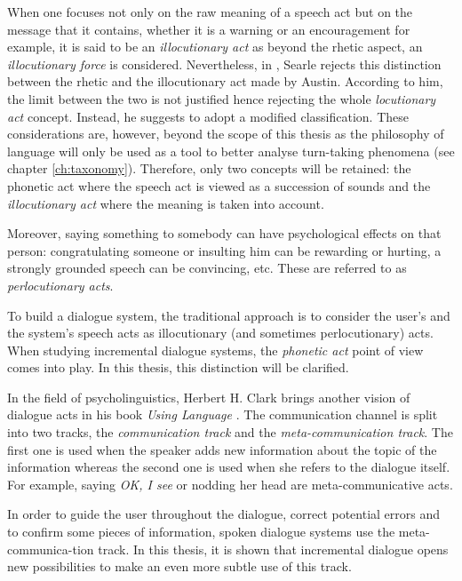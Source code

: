     When one focuses not only on the raw meaning of a speech act but on the message that it contains, whether it is a warning or an encouragement for example, it is said to be an \textit{illocutionary act} as beyond the rhetic aspect, an \textit{illocutionary force} is considered. Nevertheless, in \cite{Searle1968}, Searle rejects this distinction between the rhetic and the illocutionary act made by Austin. According to him, the limit between the two is not justified hence rejecting the whole \textit{locutionary act} concept. Instead, he suggests to adopt a modified classification. These considerations are, however, beyond the scope of this thesis as the philosophy of language will only be used as a tool to better analyse turn-taking phenomena (see chapter \ref{ch:taxonomy}). Therefore, only two concepts will be retained: the phonetic act where the speech act is viewed as a succession of sounds and the \textit{illocutionary act} where the meaning is taken into account.
    
    Moreover, saying something to somebody can have psychological effects on that person: congratulating someone or insulting him can be rewarding or hurting, a strongly grounded speech can be convincing, etc. These are referred to as \textit{perlocutionary acts}.
    
    To build a dialogue system, the traditional approach is to consider the user's and the system's speech acts as illocutionary (and sometimes perlocutionary) acts. When studying incremental dialogue systems, the \textit{phonetic act} point of view comes into play. In this thesis, this distinction will be clarified.
    
    In the field of psycholinguistics, Herbert H. Clark brings another vision of dialogue acts in his book \textit{Using Language} \cite{Clark1996}. The communication channel is split into two tracks, the \textit{communication track} and the \textit{meta-communication track}. The first one is used when the speaker adds new information about the topic of the information whereas the second one is used when she refers to the dialogue itself. For example, saying \textit{OK, I see} or nodding her head are meta-communicative acts. 
        
    In order to guide the user throughout the dialogue, correct potential errors and to confirm some pieces of information, spoken dialogue systems use the meta-communica-tion track. In this thesis, it is shown that incremental dialogue opens new possibilities to make an even more subtle use of this track.
        
